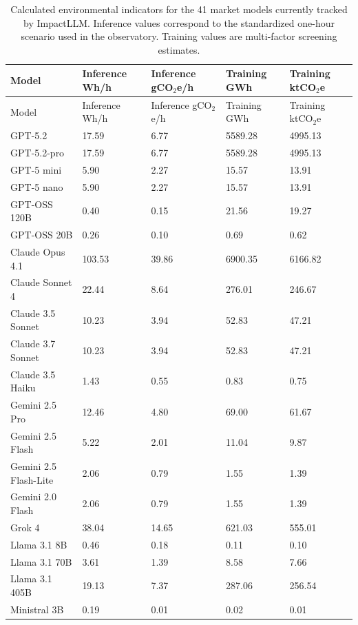 \documentclass[10pt,a4paper]{article}
\begin{document}
\begin{longtable}{|L{4.0cm}|L{2.0cm}|L{2.2cm}|L{1.7cm}|L{1.8cm}|}
\caption{Calculated environmental indicators for the 41 market models currently tracked by ImpactLLM. Inference values correspond to the standardized one-hour scenario used in the observatory. Training values are multi-factor screening estimates.}\label{tab:catalog-results-method}\\
\hline
Model & Inference Wh/h & Inference gCO$_2$e/h & Training GWh & Training ktCO$_2$e \\
\hline
\endfirsthead
\hline
Model & Inference Wh/h & Inference gCO$_2$e/h & Training GWh & Training ktCO$_2$e \\
\hline
\endhead
\hline
GPT-5.2 & 17.59 & 6.77 & 5589.28 & 4995.13 \\
\hline
GPT-5.2-pro & 17.59 & 6.77 & 5589.28 & 4995.13 \\
\hline
GPT-5 mini & 5.90 & 2.27 & 15.57 & 13.91 \\
\hline
GPT-5 nano & 5.90 & 2.27 & 15.57 & 13.91 \\
\hline
GPT-OSS 120B & 0.40 & 0.15 & 21.56 & 19.27 \\
\hline
GPT-OSS 20B & 0.26 & 0.10 & 0.69 & 0.62 \\
\hline
Claude Opus 4.1 & 103.53 & 39.86 & 6900.35 & 6166.82 \\
\hline
Claude Sonnet 4 & 22.44 & 8.64 & 276.01 & 246.67 \\
\hline
Claude 3.5 Sonnet & 10.23 & 3.94 & 52.83 & 47.21 \\
\hline
Claude 3.7 Sonnet & 10.23 & 3.94 & 52.83 & 47.21 \\
\hline
Claude 3.5 Haiku & 1.43 & 0.55 & 0.83 & 0.75 \\
\hline
Gemini 2.5 Pro & 12.46 & 4.80 & 69.00 & 61.67 \\
\hline
Gemini 2.5 Flash & 5.22 & 2.01 & 11.04 & 9.87 \\
\hline
Gemini 2.5 Flash-Lite & 2.06 & 0.79 & 1.55 & 1.39 \\
\hline
Gemini 2.0 Flash & 2.06 & 0.79 & 1.55 & 1.39 \\
\hline
Grok 4 & 38.04 & 14.65 & 621.03 & 555.01 \\
\hline
Llama 3.1 8B & 0.46 & 0.18 & 0.11 & 0.10 \\
\hline
Llama 3.1 70B & 3.61 & 1.39 & 8.58 & 7.66 \\
\hline
Llama 3.1 405B & 19.13 & 7.37 & 287.06 & 256.54 \\
\hline
Ministral 3B & 0.19 & 0.01 & 0.02 & 0.01 \\

\end{longtable}
\end{document}
